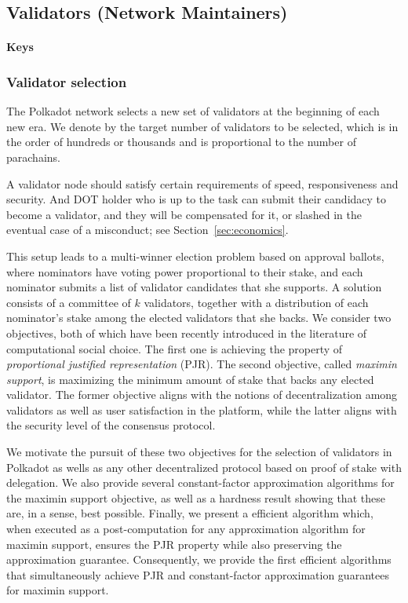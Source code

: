 \subsection{Validators (Network Maintainers)}\label{sec:validators}
 \paragraph{Keys}

 \subsubsection{Validator selection}

 The Polkadot network selects a new set of validators at the beginning of each new era. We denote by \nval the target number of validators to be selected, which is in the order of hundreds or thousands and is proportional to the number of parachains.

A validator node should satisfy certain requirements of speed, responsiveness and security. And DOT holder who is up to the task can submit their candidacy to become a validator, and they will be compensated for it, or slashed in the eventual case of a misconduct; see Section~\ref{sec:economics}.

This setup leads to a multi-winner election problem based on approval ballots, where nominators have voting power proportional to their stake, and each nominator submits a list of validator candidates that she supports. A solution consists of a committee of $k$ validators, together with a distribution of each nominator's stake among the elected validators that she backs. We consider two objectives, both of which have been recently introduced in the literature of computational social choice. The first one is achieving the property of \emph{proportional justified representation} (PJR). The second objective, called \emph{maximin support}, is maximizing the minimum amount of stake that backs any elected validator. The former objective aligns with the notions of decentralization among validators as well as user satisfaction in the platform, while the latter aligns with the security level of the consensus protocol.

We motivate the pursuit of these two objectives for the selection of validators in Polkadot as wells as any other decentralized protocol based on proof of stake with delegation. We also provide several constant-factor approximation algorithms for the maximin support objective, as well as a hardness result showing that these are, in a sense, best possible. Finally, we present a efficient algorithm which, when executed as a post-computation for any approximation algorithm for maximin support, ensures the PJR property while also preserving the approximation guarantee. Consequently, we provide the first efficient algorithms that simultaneously achieve PJR and constant-factor approximation guarantees for maximin support.
